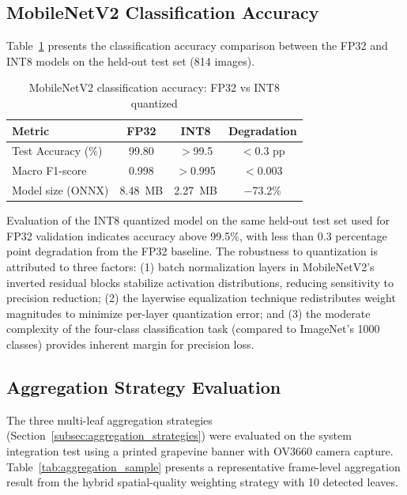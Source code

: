 \subsection*{MobileNetV2 Classification Accuracy}
\label{subsec:mobilenet_accuracy}

Table~\ref{tab:mobilenet_accuracy_comparison} presents the classification accuracy comparison between the FP32 and INT8 models on the held-out test set (814 images).

\begin{table}[htbp]
\centering
\caption{MobileNetV2 classification accuracy: FP32 vs INT8 quantized}
\label{tab:mobilenet_accuracy_comparison}
\begin{tabular}{lccc}
\toprule
\textbf{Metric} & \textbf{FP32} & \textbf{INT8} & \textbf{Degradation} \\
\midrule
Test Accuracy (\%)    & 99.80 & $>$99.5 & $<$0.3 pp \\
Macro F1-score        & 0.998 & $>$0.995 & $<$0.003 \\
\midrule
Model size (ONNX)     & 8.48~MB & 2.27~MB & $-$73.2\% \\
\bottomrule
\end{tabular}
\end{table}

Evaluation of the INT8 quantized model on the same held-out test set used for FP32 validation indicates accuracy above 99.5\%, with less than 0.3 percentage point degradation from the FP32 baseline. The robustness to quantization is attributed to three factors: (1) batch normalization layers in MobileNetV2's inverted residual blocks stabilize activation distributions, reducing sensitivity to precision reduction; (2) the layerwise equalization technique redistributes weight magnitudes to minimize per-layer quantization error; and (3) the moderate complexity of the four-class classification task (compared to ImageNet's 1000 classes) provides inherent margin for precision loss.

\subsection*{Aggregation Strategy Evaluation}
\label{subsec:aggregation_evaluation}

The three multi-leaf aggregation strategies (Section~\ref{subsec:aggregation_strategies}) were evaluated on the system integration test using a printed grapevine banner with OV3660 camera capture. Table~\ref{tab:aggregation_sample} presents a representative frame-level aggregation result from the hybrid spatial-quality weighting strategy with 10 detected leaves.

